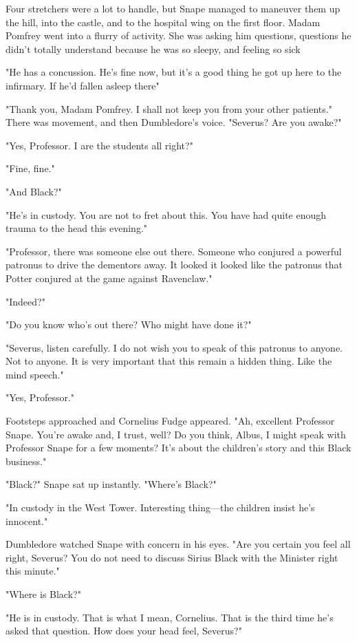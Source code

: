 Four stretchers were a lot to handle, but Snape managed to maneuver them up the hill, into the castle, and to the hospital wing on the first floor. Madam Pomfrey went into a flurry of activity. She was asking him questions, questions he didn't totally understand because he was so sleepy, and feeling so sick{\el}

\sbreak

"He has a concussion. He's fine now, but it's a good thing he got up here to the infirmary. If he'd fallen asleep there{\el}"

"Thank you, Madam Pomfrey. I shall not keep you from your other patients." There was movement, and then Dumbledore's voice. "Severus? Are you awake?"

"Yes, Professor. I{\el} are the students all right?"

"Fine, fine."

"And Black?"

"He's in custody. You are not to fret about this. You have had quite enough trauma to the head this evening."

"Professor, there was someone else out there. Someone who conjured a powerful patronus to drive the dementors away. It looked{\el} it looked like the patronus that Potter conjured at the game against Ravenclaw."

"Indeed?"

"Do you know who's out there? Who might have done it?"

"Severus, listen carefully. I do not wish you to speak of this patronus to anyone. Not to anyone. It is very important that this remain a hidden thing. Like the mind speech."

"Yes, Professor."

Footsteps approached and Cornelius Fudge appeared. "Ah, excellent Professor Snape. You're awake and, I trust, well? Do you think, Albus, I might speak with Professor Snape for a few moments? It's about the children's story and this Black business."

"Black?" Snape sat up instantly. "Where's Black?"

"In custody in the West Tower. Interesting thing—the children insist he's innocent."

Dumbledore watched Snape with concern in his eyes. "Are you certain you feel all right, Severus? You do not need to discuss Sirius Black with the Minister right this minute."

"Where is Black?"

"He is in custody. That is what I mean, Cornelius. That is the third time he's asked that question. How does your head feel, Severus?"

